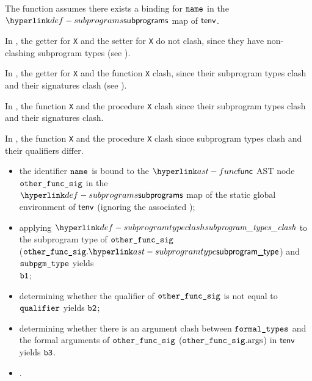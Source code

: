 The function assumes there exists a binding for $\name$ in the
$\subprograms$ map of $\tenv$.

In , the getter for \verb|X| and the setter for \verb|X| do not clash,
since they have non-clashing subprogram types (see ).

In , the getter for \verb|X| and the function \verb|X| clash,
since their subprogram types clash and their signatures clash (see ).

In , the function \verb|X| and the procedure \verb|X| clash
since their subprogram types clash and their signatures clash.

In , the function \verb|X| and the procedure \verb|X| clash since subprogram types clash and their qualifiers differ.

\ProseParagraph
\AllApply
\begin{itemize}
  \item the identifier $\name$ is bound to the $\func$ AST node $\otherfuncsig$ in the \\
        $\subprograms$ map
        of the static global environment of $\tenv$ (ignoring the associated \sideeffectdescriptorsterm);
  \item applying $\subprogramtypesclash$ to the subprogram type of $\otherfuncsig$ \\
        ($\otherfuncsig.\subprogramtype$) and $\subpgmtype$ yields \\
        $\vbone$;
  \item determining whether the qualifier of $\otherfuncsig$ is not equal to $\vqualifier$ yields $\vbtwo$;
  \item determining whether there is an argument clash between $\formaltypes$ and \\
        the formal arguments of $\otherfuncsig$ ($\otherfuncsig.\funcargs$) in $\tenv$ yields $\vbthree$\ProseOrTypeError.
  \item \Proseeqdef{$\vb$}{$\vbone \land (\vbtwo \lor \vbthree)$}.
\end{itemize}

\FormallyParagraph
\begin{mathpar}
\end{mathpar}
  

